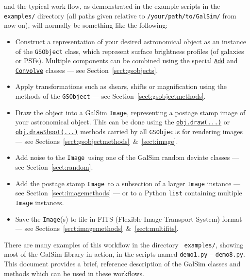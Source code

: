 \documentclass[preprint,11pt]{aastex}
\begin{document}
and the typical work flow, as demonstrated in the example scripts in the {\tt
examples/} directory (all paths given relative to
\texttt{/your/path/to/GalSim/} from now on), will normally
be something like the following:
\begin{itemize}

\item Construct a representation of your desired astronomical object
  as an instance of the {\tt GSObject} class, which represent surface brightness profiles (of galaxies or PSFs).  Multiple components can be
  combined using the special
  \href{http://galsim-developers.github.com/GalSim/classgalsim_1_1base_1_1_add.html}{\texttt{Add}}
  and 
  \href{http://galsim-developers.github.com/GalSim/classgalsim_1_1base_1_1_convolve.html}{\texttt{Convolve}}
  classes --- see Section~\ref{sect:gsobjects}.
\item Apply transformations such as shears, shifts or magnification
  using the methods of the \texttt{GSObject} --- see Section~\ref{sect:gsobjectmethods}.
\item Draw the object into a GalSim \texttt{Image}, representing a postage
  stamp image of your astronomical object.  This can be done using the
  \href{http://galsim-developers.github.com/GalSim/classgalsim_1_1base_1_1_g_s_object.html#ae0b346a8b438dedbc7f60a52220869d8}{\texttt{obj.draw(...)}}
  or
  \href{http://galsim-developers.github.com/GalSim/classgalsim_1_1base_1_1_g_s_object.html#a42ac334d2840ba3fa832988e998beca0}{\texttt{obj.drawShoot(...)}}
  methods carried by all \texttt{GSObject}s for rendering images --- see
  Sections~\ref{sect:gsobjectmethods}~\&~\ref{sect:image}.
\item Add noise to the \texttt{Image}~using one of the GalSim
  random deviate classes --- see Section~\ref{sect:random}.
\item Add the postage stamp \texttt{Image}~to a subsection of a larger
  \texttt{Image} 
  instance --- see
  Section~\ref{sect:imagemethods} --- or to a Python
  \texttt{list} containing multiple \texttt{Image} instances.
\item Save the \texttt{Image}(s) to file in FITS (Flexible Image Transport
  System) format --- see Sections~\ref{sect:imagemethods}~\&~\ref{sect:multifits}.
\end{itemize}

There are many examples of this workflow in the directory {\tt
 examples/}, showing most of the GalSim library in action, in
the scripts named \texttt{demo1.py} -- \texttt{demo8.py}.  This
document provides a brief, reference description of the GalSim classes
and methods which can be used in these workflows.
\end{document}
